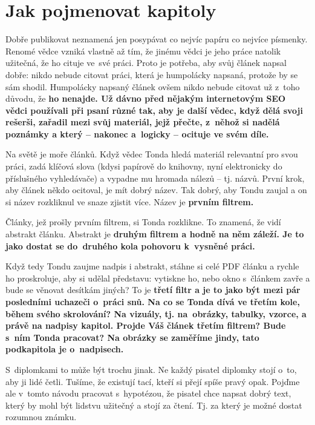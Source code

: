 \section{Jak pojmenovat kapitoly}
Dobře publikovat neznamená jen posypávat co nejvíc papíru co nejvíce písmenky. Renomé vědce vzniká vlastně až tím, že jinému vědci je jeho práce natolik užitečná, že ho cituje ve~své práci. Proto je potřeba, aby svůj článek napsal dobře: nikdo nebude citovat práci, která je humpolácky napsaná, protože by se sám shodil. 
Humpolácky napsaný článek ovšem nikdo nebude citovat už z~toho důvodu, že \bf ho nenajde\rm . Už dávno před nějakým internetovým SEO vědci používali při psaní různé  tak, aby je další vědec, když dělá svoji rešerši, zařadil mezi svůj materiál, jejž přečte, z~něhož si nadělá poznámky a který -- nakonec a~logicky -- ocituje ve svém díle.

Na světě je moře článků. Když vědec Tonda hledá materiál relevantní pro svou práci, zadá klíčová slova (kdysi papírově do knihovny, nyní elektronicky do příslušného vyhledávače) a vypadne mu hromada nálezů -- tj. názvů. První krok, aby článek někdo ocitoval, je mít dobrý název. Tak dobrý, aby Tondu zaujal a on si název rozkliknul ve snaze zjistit více. Název je \bf prvním filtrem\rm . 

Články, jež prošly prvním filtrem, si Tonda rozklikne. To znamená, že vidí abstrakt článku. Abstrakt je \bf druhým filtrem \rm a hodně na něm záleží. Je to jako dostat se do~druhého kola pohovoru k~vysněné práci. 

Když tedy Tondu zaujme nadpis i abstrakt, stáhne si celé PDF článku a rychle ho proskroluje, aby si udělal představu: vytiskne ho, nebo okno s~článkem zavře a bude se věnovat desítkám jiných? To je \bf třetí filtr \rm a je to jako být mezi pár posledními uchazeči o~práci snů. Na co se Tonda dívá ve třetím kole, během svého skrolování? Na vizuály, tj. na~obrázky, tabulky, vzorce, a právě na nadpisy kapitol. Projde Váš článek třetím filtrem? Bude s~ním Tonda pracovat? Na obrázky se zaměříme jindy, tato podkapitola je o~nadpisech.

S~diplomkami to může být trochu jinak. Ne každý pisatel diplomky stojí o~to, aby ji lidé četli. Tušíme, že existují tací, kteří si přejí spíše pravý opak. Pojďme ale v~tomto návodu pracovat s~hypotézou, že pisatel chce napsat dobrý text, který by mohl být lidstvu užitečný a stojí za čtení. Tj. za který je možné dostat rozumnou známku.

